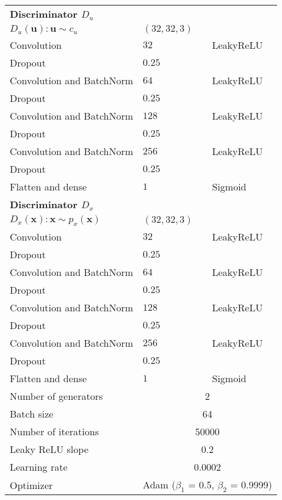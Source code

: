 \begin{table}
\begin{tabular}{ p{5cm}|p{2cm}|p{1.5cm}}
		\textbf{Discriminator $D_u$} & &  \\ 
		$D_u(\mathbf{u}):\mathbf{u} \sim c_u$ & $(32,32,3)$\\ 
		Convolution & $32$ & LeakyReLU \\ 
		Dropout & $0.25$ &  \\ 
		Convolution and BatchNorm & $64$ & LeakyReLU \\ 
		Dropout & $0.25$ &  \\ 
		Convolution and BatchNorm & $128$ & LeakyReLU \\ 
		Dropout & $0.25$ &  \\ 
		Convolution and BatchNorm & $256$ & LeakyReLU \\ 
		Dropout & $0.25$ &  \\ 
		Flatten and dense & $1$ & Sigmoid \\   \hline
		\textbf{Discriminator $D_x$} & &  \\ 
		$D_x(\mathbf{x}):\mathbf{x} \sim p_x(\mathbf{x})$ & $(32,32,3)$ \\ 
		Convolution & $32$ & LeakyReLU \\ 
		Dropout & $0.25$ &  \\ 
		Convolution and BatchNorm & $64$ & LeakyReLU \\ 
		Dropout & $0.25$ &  \\ 
		Convolution and BatchNorm & $128$ & LeakyReLU \\ 
		Dropout & $0.25$ &  \\ 
		Convolution and BatchNorm & $256$ & LeakyReLU \\ 
		Dropout & $0.25$ &  \\ 
		Flatten and dense & $1$ & Sigmoid \\   \hline  \hline
		
		
		Number of generators & \multicolumn{2}{c}{2} \\
		Batch size & \multicolumn{2}{c}{64} \\
		Number of iterations & \multicolumn{2}{c}{50000} \\ 
		Leaky ReLU slope &  \multicolumn{2}{c}{0.2} \\ 
		Learning rate &  \multicolumn{2}{c}{0.0002}  \\ 
		Optimizer &  \multicolumn{2}{c}{Adam ($\beta_1$ = 0.5, $\beta_2$ = 0.9999)}  \\ \hline
	\end{tabular}
	
	\label{tab:combined_images}
\end{table}

